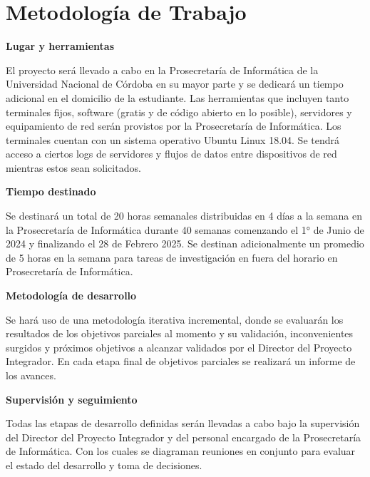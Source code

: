 \section{Metodología de Trabajo}

\textbf{Lugar y herramientas}
\vspace{0.3cm}

El proyecto será llevado a cabo en la Prosecretaría de Informática de la Universidad
Nacional de Córdoba en su mayor parte y se dedicará un tiempo adicional en el domicilio de
la estudiante.
Las herramientas que incluyen tanto terminales fijos, software (gratis y de código abierto en
lo posible), servidores y equipamiento de red serán provistos por la Prosecretaría de
Informática. Los terminales cuentan con un sistema operativo Ubuntu Linux 18.04. Se
tendrá acceso a ciertos logs de servidores y flujos de datos entre dispositivos de red
mientras estos sean solicitados.

\vspace{0.3cm}
\textbf{Tiempo destinado}
\vspace{0.3cm}

Se destinará un total de 20 horas semanales distribuidas en 4 días a la semana en la Prosecretaría de Informática durante 40 semanas comenzando el 1° de Junio de 2024 y finalizando el 28 de Febrero 2025. Se destinan adicionalmente un promedio de 5 horas en la semana para tareas de investigación en fuera del horario en Prosecretaría de Informática.

\vspace{0.3cm}
\textbf{Metodología de desarrollo}
\vspace{0.3cm}

Se hará uso de una metodología iterativa incremental, donde se evaluarán los resultados de los objetivos parciales al momento y su validación, inconvenientes surgidos y próximos objetivos a alcanzar validados por el Director del Proyecto Integrador. En cada etapa final de objetivos parciales se realizará un informe de los avances.

\vspace{0.3cm}
\textbf{Supervisión y seguimiento}
\vspace{0.3cm}

Todas las etapas de desarrollo definidas serán llevadas a cabo bajo la supervisión del Director del Proyecto Integrador y del personal encargado de la Prosecretaría de Informática. Con los cuales se diagraman reuniones en conjunto para evaluar el estado del desarrollo y toma de decisiones.
